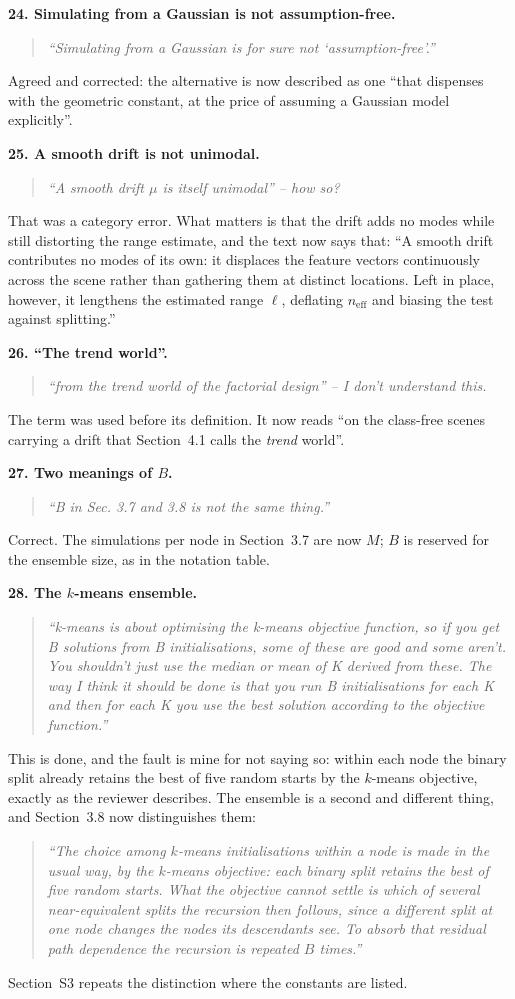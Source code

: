 \documentclass[11pt]{article}
\newcommand{\neff}{n_{\mathrm{eff}}}
\newcommand{\R}[1]{\medskip\noindent\textbf{#1}\quad}
\newenvironment{rquote}{\begin{quote}\itshape}{\end{quote}}
\begin{document}
\R{24. Simulating from a Gaussian is not assumption-free.}
\begin{rquote}
``Simulating from a Gaussian is for sure not `assumption-free'.''
\end{rquote}
Agreed and corrected: the alternative is now described as one ``that dispenses
with the geometric constant, at the price of assuming a Gaussian model
explicitly''.

\R{25. A smooth drift is not unimodal.}
\begin{rquote}
``A smooth drift $\mu$ is itself unimodal'' -- how so?
\end{rquote}
That was a category error. What matters is that the drift adds no modes while
still distorting the range estimate, and the text now says that: ``A smooth
drift contributes no modes of its own: it displaces the feature vectors
continuously across the scene rather than gathering them at distinct locations.
Left in place, however, it lengthens the estimated range $\ell$, deflating
$\neff$ and biasing the test against splitting.''

\R{26. ``The trend world''.}
\begin{rquote}
``from the trend world of the factorial design'' -- I don't understand this.
\end{rquote}
The term was used before its definition. It now reads ``on the class-free
scenes carrying a drift that Section~4.1 calls the \emph{trend} world''.

\R{27. Two meanings of $B$.}
\begin{rquote}
``B in Sec. 3.7 and 3.8 is not the same thing.''
\end{rquote}
Correct. The simulations per node in Section~3.7 are now $M$; $B$ is reserved
for the ensemble size, as in the notation table.

\R{28. The $k$-means ensemble.}
\begin{rquote}
``k-means is about optimising the k-means objective function, so if you get B
solutions from B initialisations, some of these are good and some aren't. You
shouldn't just use the median or mean of K derived from these. The way I think
it should be done is that you run B initialisations for each K and then for
each K you use the best solution according to the objective function.''
\end{rquote}
This is done, and the fault is mine for not saying so: within each node the
binary split already retains the best of five random starts by the $k$-means
objective, exactly as the reviewer describes. The ensemble is a second and
different thing, and Section~3.8 now distinguishes them:
\begin{rquote}
``The choice among $k$-means initialisations \emph{within} a node is made in
the usual way, by the $k$-means objective: each binary split retains the best
of five random starts. What the objective cannot settle is which of several
near-equivalent splits the recursion then follows, since a different split at
one node changes the nodes its descendants see. To absorb that residual path
dependence the recursion is repeated $B$ times.''
\end{rquote}
Section~S3 repeats the distinction where the constants are listed.
\end{document}

